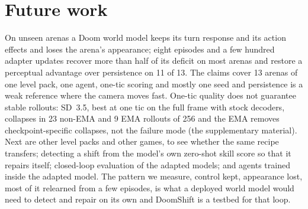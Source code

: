 \documentclass{article}
\newif\ifdraftmarks \draftmarkstrue
\newif\ifwithappendix \withappendixfalse %
\newcommand{\appref}[1]{\ifwithappendix Appendix~\ref{#1}\else the supplementary material\fi}
\newcommand{\tbd}{\ifdraftmarks\textcolor[rgb]{0,0.3,0.75}{[tbd]}\else[tbd]\fi}
\begin{document}
\section{Future work}
\label{sec:limits}

On unseen arenas a Doom world model keeps its turn response and its action effects and loses the arena's appearance; eight episodes and a few hundred adapter updates recover more than half of its deficit on most arenas and restore a perceptual advantage over persistence on 11 of 13.
The claims cover 13 arenas of one level pack, one agent, one-tic scoring and mostly one seed and persistence is a weak reference where the camera moves fast.
One-tic quality does not guarantee stable rollouts: SD~3.5, best at one tic on the full frame with stock decoders, collapses in 23 non-EMA and 9 EMA rollouts of 256 and the EMA removes checkpoint-specific collapses, not the failure mode (\appref{app:closedloop}).
Next are other level packs and other games, to see whether the same recipe transfers; detecting a shift from the model's own zero-shot skill score so that it repairs itself; closed-loop evaluation of the adapted models; and agents trained inside the adapted model.
The pattern we measure, control kept, appearance lost, most of it relearned from a few episodes, is what a deployed world model would need to detect and repair on its own and DoomShift is a testbed for that loop.
\label{body-end}


\clearpage
\acknowledgments{\tbd}



\ifwithappendix
\clearpage
\appendix

\fi
\end{document}
